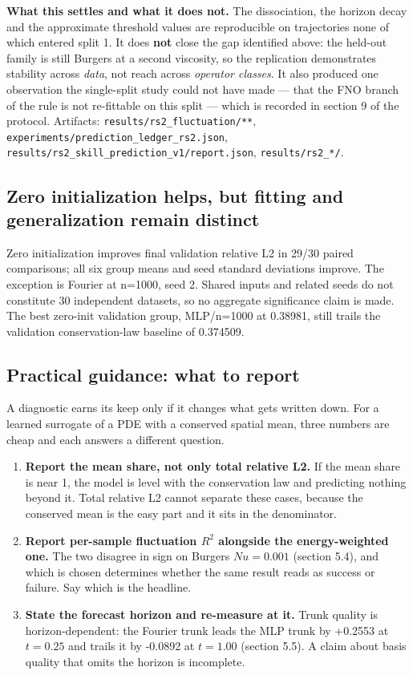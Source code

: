 \documentclass[preprint,12pt]{elsarticle}
\begin{document}
\textbf{What this settles and what it does not.} The dissociation, the horizon decay and the approximate threshold values are reproducible on trajectories none of which entered split 1. It does \textbf{not} close the gap identified above: the held-out family is still Burgers at a second viscosity, so the replication demonstrates stability across \emph{data}, not reach across \emph{operator classes}. It also produced one observation the single-split study could not have made --- that the FNO branch of the rule is not re-fittable on this split --- which is recorded in section 9 of the protocol. Artifacts: \texttt{results/rs2\_fluctuation/**}, \texttt{experiments/prediction\_ledger\_rs2.json}, \texttt{results/rs2\_skill\_prediction\_v1/report.json}, \texttt{results/rs2\_*/}.

\subsection{Zero initialization helps, but fitting and generalization remain distinct}

Zero initialization improves final validation relative L2 in 29/30 paired comparisons; all six group means and seed standard deviations improve. The exception is Fourier at n=1000, seed 2. Shared inputs and related seeds do not constitute 30 independent datasets, so no aggregate significance claim is made. The best zero-init validation group, MLP/n=1000 at 0.38981, still trails the validation conservation-law baseline of 0.374509.

\subsection{Practical guidance: what to report}

A diagnostic earns its keep only if it changes what gets written down. For a learned surrogate of a PDE with a conserved spatial mean, three numbers are cheap and each answers a different question.

\begin{enumerate}
\item \textbf{Report the mean share, not only total relative L2.} If the mean share is near 1, the model is level with the conservation law and predicting nothing beyond it. Total relative L2 cannot separate these cases, because the conserved mean is the easy part and it sits in the denominator.
\item \textbf{Report per-sample fluctuation $R^2$ alongside the energy-weighted one.} The two disagree in sign on Burgers $Nu = 0.001$ (section 5.4), and which is chosen determines whether the same result reads as success or failure. Say which is the headline.
\item \textbf{State the forecast horizon and re-measure at it.} Trunk quality is horizon-dependent: the Fourier trunk leads the MLP trunk by +0.2553 at $t = 0.25$ and trails it by -0.0892 at $t = 1.00$ (section 5.5). A claim about basis quality that omits the horizon is incomplete.
\end{enumerate}
\end{document}

